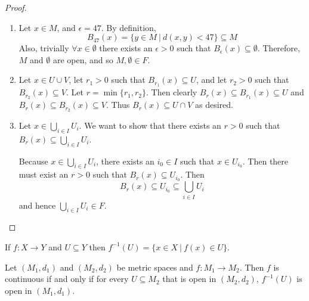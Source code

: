 \begin{proof}
	\mbox{ }\\
	\begin{enumerate}
		\item Let $x\in M$, and $\epsilon = 47$. By definition,
		\[B_{47} (x) = \{y\in M\ |\ d(x,y)<47\} \subseteq M\]
		Also, trivially $\forall x\in \emptyset$ there exists an $\epsilon > 0$ such that $B_\epsilon (x) \subseteq \emptyset$. Therefore, $M$ and $\emptyset$ are open, and so $M, \emptyset\in F$.
		
		\item Let $x\in U\cup V$, let $r_1 >0$ such that $B_{r_1} (x) \subseteq U$, and let $r_2 >0$ such that $B_{r_2} (x) \subseteq V$. Let $r = \min\{r_1, r_2 \}$. Then clearly $B_r (x) \subseteq B_{r_1} (x) \subseteq U$ and $B_r (x) \subseteq B_{r_2} (x) \subseteq V$. Thus $B_r (x) \subseteq U \cap V$ as desired.
		
		\item Let $x \in \bigcup_{i\in I} U_i$. We want to show that there exists an $r>0$ such that $B_r (x) \subseteq \bigcup_{i\in I} U_i$. 
		
		Because $x\in \bigcup_{i\in I} U_i$, there exists an $i_0 \in I$ such that $x\in U_{i_0}$. Then there must exist an $r>0$ such that $B_r (x) \subseteq U_{i_0}$. Then
		\[B_r (x) \subseteq U_{i_0} \subseteq \bigcup_{i\in I} U_i\]
		and hence $\bigcup_{i\in I} U_i\in F$. 
	\end{enumerate}
\end{proof}
\begin{definition}
	If $f:X \to Y$ and $U \subseteq Y$ then $f^{-1} (U) = \{x\in X\ |\ f(x) \in U\}$. 
\end{definition}
\begin{theorem}
	Let $(M_1, d_1)$ and $(M_2, d_2)$ be metric spaces and $f: M_1 \to M_2$. Then $f$ is continuous if and only if for every $U \subseteq M_2$ that is open in $(M_2, d_2)$, $f^{-1} (U)$ is open in $(M_1, d_1)$. 
\end{theorem}
\pagebreak 
